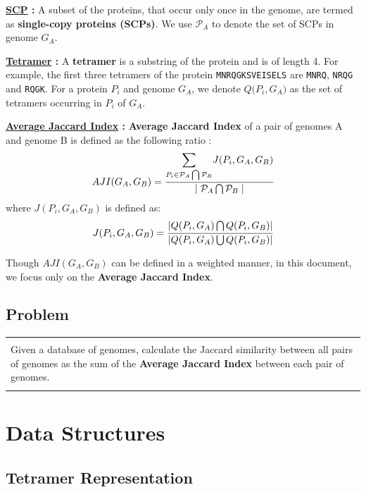 \documentclass{article}[11pt]
\begin{document}
\noindent \textbf{\underline{SCP} :} A subset of the proteins, that occur only once in the genome, are termed as \textbf{single-copy proteins (SCPs)}. 
We use $\mathcal{P}_A$ to denote the set of SCPs in genome $G_A$.

\noindent \textbf{\underline{Tetramer} :} A \textbf{tetramer} is a substring of the protein and is of length 4. For example, the first three tetramers of the protein \texttt{MNRQGKSVEISELS} are  \texttt{MNRQ}, \texttt{NRQG} and \texttt{RQGK}.
For a protein $P_i$ and genome $G_A$, we denote $Q({P_i, G_A)}$ as the set of tetramers occurring in  $P_i$ of $G_A$.


\noindent \textbf{\underline{Average Jaccard Index} :} 
\textbf{Average Jaccard Index} of a pair of genomes A and genome B is defined as the following ratio :
\begin{equation}
    \label{eq:avgJaccard}
    AJI({G_A, G_B}) = \cfrac{
     \mathlarger{\sum_{ P_i \in \mathcal{P}_A \bigcap \mathcal{P}_B }}J({P_i, G_A, G_B})}{
     \mid \mathcal{P}_A \bigcap \mathcal{P}_B\mid}
\end{equation}
where $J({P_i, G_A, G_B})$ is defined as:
\begin{equation}
    \label{eq:pairwiseproteinJaccard}
    J(P_i, G_A, G_B) = \cfrac{|Q(P_i, G_A) \bigcap Q(P_i, G_B)|}{
    |Q(P_i, G_A) \bigcup Q(P_i, G_B)| }
\end{equation}

Though $AJI({G_A, G_B})$ can be defined in a weighted manner,  in this document, we focus only on the \textbf{Average Jaccard Index}. 


\subsection{Problem} 
\begin{tabular}{|p{12cm}|}
\hline \\
Given a database of genomes, calculate the Jaccard similarity between all pairs of genomes as the sum of the \textbf{Average Jaccard Index} between each pair of genomes. \\
\\
\hline
\end{tabular}

\section{Data Structures}

\subsection{Tetramer Representation}
\end{document}
